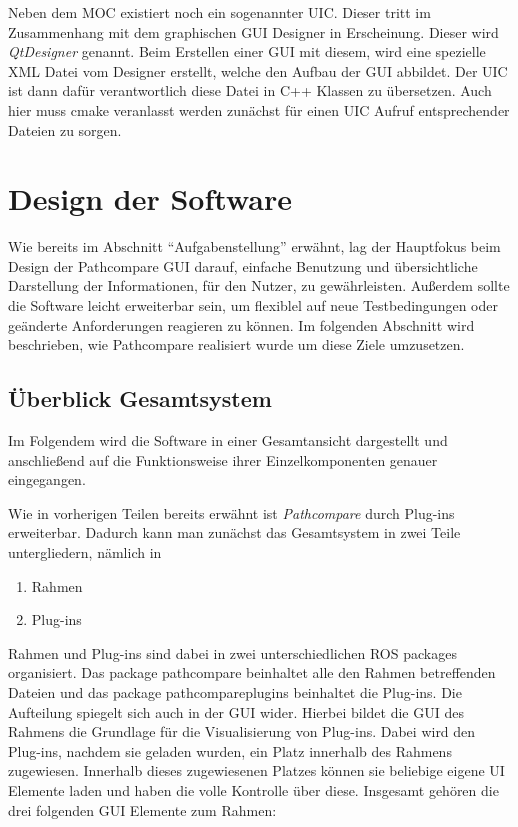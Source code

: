 Neben dem \gls{MOC} existiert noch ein sogenannter \gls{UIC}. Dieser tritt im
Zusammenhang mit dem graphischen GUI Designer in Erscheinung. Dieser wird
\textit{QtDesigner} genannt. Beim Erstellen einer GUI mit diesem, wird eine
spezielle XML Datei vom Designer erstellt, welche den Aufbau der GUI abbildet.
Der UIC ist dann dafür verantwortlich diese Datei in C++ Klassen zu übersetzen.
Auch hier muss cmake veranlasst werden zunächst für einen \gls{UIC} Aufruf
entsprechender Dateien zu sorgen.


\section{Design der Software}
Wie bereits im Abschnitt ``Aufgabenstellung'' erwähnt, lag der Hauptfokus beim
Design der Pathcompare GUI darauf, einfache Benutzung und übersichtliche
Darstellung der Informationen, für den Nutzer, zu gewährleisten.  Außerdem
sollte die Software leicht erweiterbar sein, um flexiblel auf neue
Testbedingungen oder geänderte Anforderungen reagieren zu können.
Im folgenden Abschnitt wird beschrieben, wie Pathcompare realisiert wurde um
diese Ziele umzusetzen.

\subsection{Überblick Gesamtsystem}

Im Folgendem wird die Software in einer Gesamtansicht dargestellt und
anschließend auf die Funktionsweise ihrer Einzelkomponenten genauer eingegangen.

Wie in vorherigen Teilen bereits erwähnt ist \textit{Pathcompare} durch
Plug-ins erweiterbar. Dadurch kann man zunächst das Gesamtsystem in zwei Teile
untergliedern, nämlich in 

\begin{enumerate}
  \item Rahmen
  \item Plug-ins
\end{enumerate}

Rahmen und Plug-ins sind dabei in zwei unterschiedlichen ROS packages
organisiert. Das package pathcompare beinhaltet alle den Rahmen betreffenden
Dateien und das package pathcompareplugins beinhaltet die Plug-ins.
Die Aufteilung spiegelt sich auch in der GUI wider.
Hierbei bildet die GUI des Rahmens die Grundlage für die Visualisierung von Plug-ins.
Dabei wird den Plug-ins, nachdem sie geladen wurden, ein Platz innerhalb des
Rahmens zugewiesen. Innerhalb dieses zugewiesenen Platzes können sie beliebige
eigene UI Elemente laden und haben die volle Kontrolle über diese. Insgesamt
gehören die drei folgenden GUI Elemente zum Rahmen:

